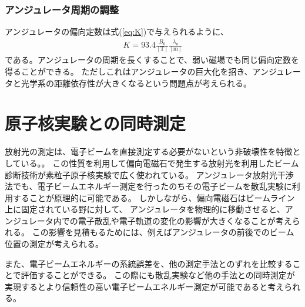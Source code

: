 \documentclass[a4paper,11pt,uplatex]{jsbook}
\begin{document}
\subsubsection{アンジュレータ周期の調整}
アンジュレータの偏向定数は式(\ref{eq:K})で与えられるように、
\begin{eqnarray}
  K = 93.4 \frac{B_0}{[\text{T}]}\frac{\lambda_u}{[\text{m}]}
\end{eqnarray}
である。アンジュレータの周期を長くすることで、弱い磁場でも同じ偏向定数を得ることができる。
ただしこれはアンジュレータの巨大化を招き、アンジュレータと光学系の距離依存性が大きくなるという問題点が考えられる。

\section{原子核実験との同時測定}
放射光の測定は、電子ビームを直接測定する必要がないという非破壊性を特徴としている。。
この性質を利用して偏向電磁石で発生する放射光を利用したビーム診断技術が素粒子原子核実験で広く使われている。
アンジュレータ放射光干渉法でも、電子ビームエネルギー測定を行ったのちその電子ビームを散乱実験に利用することが原理的に可能である。
しかしながら、偏向電磁石はビームライン上に固定されている野に対して、
アンジュレータを物理的に移動させると、アンジュレータ内での電子散乱や電子軌道の変化の影響が大きくなることが考えられる。
この影響を見積もるためには、例えばアンジュレータの前後でのビーム位置の測定が考えられる。

また、電子ビームエネルギーの系統誤差を、他の測定手法とのずれを比較することで評価することができる。
この際にも散乱実験など他の手法との同時測定が実現するとより信頼性の高い電子ビームエネルギー測定が可能であると考えられる。
\end{document}

